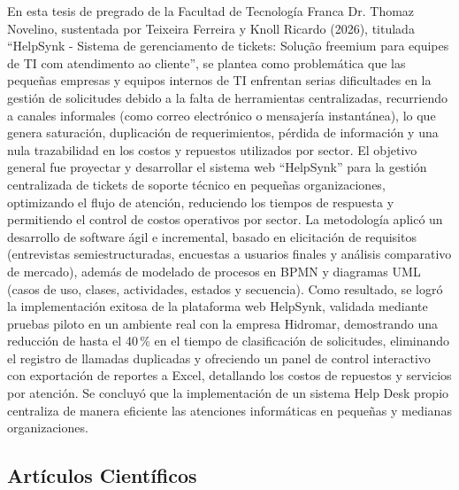 En esta tesis de pregrado de la Facultad de Tecnología Franca Dr. Thomaz Novelino, sustentada por Teixeira Ferreira y Knoll Ricardo (2026), titulada ``HelpSynk - Sistema de gerenciamento de tickets: Solução freemium para equipes de TI com atendimento ao cliente'', se plantea como problemática que las pequeñas empresas y equipos internos de TI enfrentan serias dificultades en la gestión de solicitudes debido a la falta de herramientas centralizadas, recurriendo a canales informales (como correo electrónico o mensajería instantánea), lo que genera saturación, duplicación de requerimientos, pérdida de información y una nula trazabilidad en los costos y repuestos utilizados por sector. El objetivo general fue proyectar y desarrollar el sistema web ``HelpSynk'' para la gestión centralizada de tickets de soporte técnico en pequeñas organizaciones, optimizando el flujo de atención, reduciendo los tiempos de respuesta y permitiendo el control de costos operativos por sector. La metodología aplicó un desarrollo de software ágil e incremental, basado en elicitación de requisitos (entrevistas semiestructuradas, encuestas a usuarios finales y análisis comparativo de mercado), además de modelado de procesos en BPMN y diagramas UML (casos de uso, clases, actividades, estados y secuencia). Como resultado, se logró la implementación exitosa de la plataforma web HelpSynk, validada mediante pruebas piloto en un ambiente real con la empresa Hidromar, demostrando una reducción de hasta el 40\,\% en el tiempo de clasificación de solicitudes, eliminando el registro de llamadas duplicadas y ofreciendo un panel de control interactivo con exportación de reportes a Excel, detallando los costos de repuestos y servicios por atención. Se concluyó que la implementación de un sistema Help Desk propio centraliza de manera eficiente las atenciones informáticas en pequeñas y medianas organizaciones.

\vspace{1.2em}

\subsection{Artículos Científicos}


